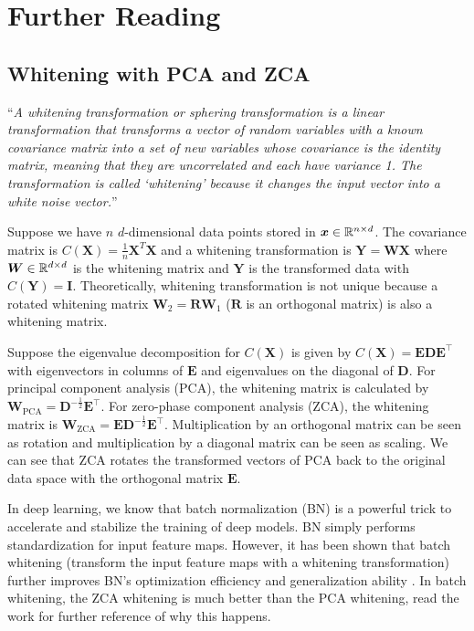 \documentclass{article}
\begin{document}
\section*{Further Reading}

\subsection*{Whitening with PCA and ZCA}

``\emph{A whitening transformation or sphering transformation is a linear transformation that transforms a vector of random variables with a known covariance matrix into a set of new variables whose covariance is the identity matrix, meaning that they are uncorrelated and each have variance 1. The transformation is called `whitening' because it changes the input vector into a white noise vector.}'' \cite{whitening}

Suppose we have $n$ $d$-dimensional data points stored in $\bm{x} \in \mathbb{R}^{n \times d}$. The covariance matrix is $C(\bm{X}) = \frac{1}{n} \bm{X}^{T} \bm{X}$ and a whitening transformation is $\bm{Y} = \bm{W} \bm{X}$ where $\bm{W} \in \mathbb{R}^{d \times d}$ is the whitening matrix and $\bm{Y}$ is the transformed data with $C(\bm{Y}) = \bm{I}$. Theoretically, whitening transformation is not unique because a rotated whitening matrix $\bm{W}_2 = \bm{R} \bm{W}_1$ ($\bm{R}$ is an orthogonal matrix) is also a whitening matrix. 

Suppose the eigenvalue decomposition for $C(\bm{X})$ is given by $C(\bm{X}) = \bm{E} \bm{D} \bm{E}^\top$ with eigenvectors in columns of $\bm{E}$ and eigenvalues on the diagonal of $\bm{D}$. For principal component analysis (PCA), the whitening matrix is calculated by $\bm{W}_{\text{PCA}} = \bm{D}^{-\frac{1}{2}} \bm{E}^\top$. For zero-phase component analysis (ZCA), the whitening matrix is $\bm{W}_{\text{ZCA}} = \bm{E} \bm{D}^{-\frac{1}{2}} \bm{E}^\top$. Multiplication by an orthogonal matrix can be seen as rotation and multiplication by a diagonal matrix can be seen as scaling. We can see that ZCA rotates the transformed vectors of PCA back to the original data space with the orthogonal matrix $\bm{E}$.

In deep learning, we know that batch normalization (BN) is a powerful trick to accelerate and stabilize the training of deep models. BN simply performs standardization for input feature maps. However, it has been shown that batch whitening (transform the input feature maps with a whitening transformation) further improves BN's optimization efficiency and generalization ability \cite{batch_whitening}. In batch whitening, the ZCA whitening is much better than the PCA whitening, read the work \cite{batch_whitening} for further reference of why this happens.
\end{document}
